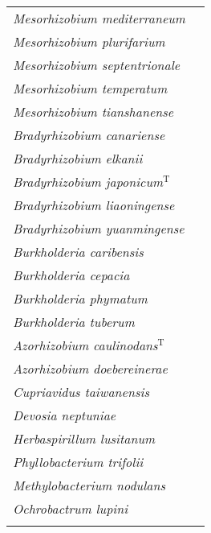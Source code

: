 {\begin{longtable}{ll}
    \emph{Mesorhizobium mediterraneum}          & \citep{Nour95} \citealp{Jarvis97}     \\
    \emph{Mesorhizobium plurifarium}            & \citealp{deLajudie98b}                \\
    \emph{Mesorhizobium septentrionale}         & \citealp{Gao04b}                      \\
    \emph{Mesorhizobium temperatum}             & \citealp{Gao04b}                      \\
    \emph{Mesorhizobium tianshanense}           & \citep{Chen95} \citealp{Jarvis97} \\
    \cmidrule{1-2}
    \emph{Bradyrhizobium canariense}                & \citealp{Vinuesa05b}                       \\
    \emph{Bradyrhizobium elkanii}                   & \citealp{Kuykendall93}                    \\
    \emph{Bradyrhizobium japonicum}$^{\mathrm{T}}$  & \citep{Kirchner96} \citealp{Jordan82}     \\
    \emph{Bradyrhizobium liaoningense}              & \citealp{Xu95}                            \\
    \emph{Bradyrhizobium yuanmingense}              & \citealp{Yao02}                           \\
    \cmidrule{1-2}
    \emph{Burkholderia caribensis}           & \citealp{Vandamme02} \\
    \emph{Burkholderia cepacia}              & \citealp{Vandamme02} \\
    \emph{Burkholderia phymatum}             & \citealp{Vandamme02} \\
    \emph{Burkholderia tuberum}              & \citealp{Vandamme02} \\
    \cmidrule{1-2}
    \emph{Azorhizobium caulinodans}$^{\mathrm{T}}$  & \citealp{Dreyfus88} \\
    \emph{Azorhizobium doebereinerae}               & \citealp{Souza06} \\
    \cmidrule{1-2}
    \emph{Cupriavidus taiwanensis}                  & {\footnotesize \citep{Chen01x} \citealp{Vandamme04}} \\
    \cmidrule{1-2}
    \emph{Devosia neptuniae}                        & \citealp{Rivas03}  \\
    \cmidrule{1-2}
    \emph{Herbaspirillum lusitanum}                 & \citealp{Valverde03} \\
    \cmidrule{1-2}
    \emph{Phyllobacterium trifolii}                 & \citealp{Valverde03} \\
    \cmidrule{1-2}
    \emph{Methylobacterium nodulans}                & \citealp{Jourand04} \\
    \cmidrule{1-2}
    \emph{Ochrobactrum lupini}                      & \citealp{Trujillo05} \\
    \bottomrule

  \label{t-Rhizobia-species}

  \end{longtable} }

